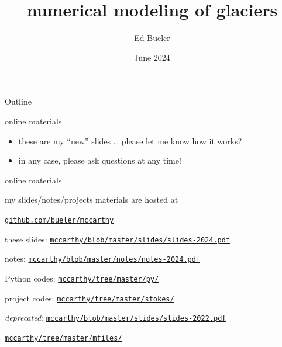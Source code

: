 \documentclass[10pt,dvipsnames]{beamer}
\title{numerical modeling of glaciers}
\date{June 2024}
\author{Ed Bueler}
\institute{the Hardware Store at McCarthy}
\begin{document}
\graphicspath{{figs/}{../figures/}}

\maketitle

\begin{frame}{Outline}
  \tableofcontents
\end{frame}

\begin{frame}{online materials}

\begin{itemize}
\item these are my ``new'' slides \dots\xspace please let me know how it works?
\item in any case, \alert{please ask questions at any time!}
\end{itemize}

\bigskip

\begin{block}{online materials}

my slides/notes/projects materials are hosted at

\medskip
\centerline{\href{https://github.com/bueler/mccarthy}{\texttt{github.com/bueler/mccarthy}}}
\end{block}

\medskip
{\footnotesize
\alert{these slides:} {\footnotesize \href{https://github.com/bueler/mccarthy/blob/master/slides/slides-2024.pdf}{\texttt{mccarthy/blob/master/slides/slides-2024.pdf}}}

notes: {\footnotesize \href{https://github.com/bueler/mccarthy/blob/master/notes/notes-2024.pdf}{\texttt{mccarthy/blob/master/notes/notes-2024.pdf}}}

\alert{Python codes:} {\footnotesize \href{https://github.com/bueler/mccarthy/tree/master/py}{\texttt{mccarthy/tree/master/py/}}}

project codes: {\footnotesize \href{https://github.com/bueler/mccarthy/tree/master/stokes}{\texttt{mccarthy/tree/master/stokes/}}}

\bigskip
\emph{deprecated}: {\footnotesize \href{https://github.com/bueler/mccarthy/blob/master/slides/slides-2022.pdf}{\texttt{mccarthy/blob/master/slides/slides-2022.pdf}}}

\vspace{-2mm}
\hspace{14.7mm} {\footnotesize \href{https://github.com/bueler/mccarthy/tree/master/mfiles}{\texttt{mccarthy/tree/master/mfiles/}}}
}
\end{frame}
\end{document}
